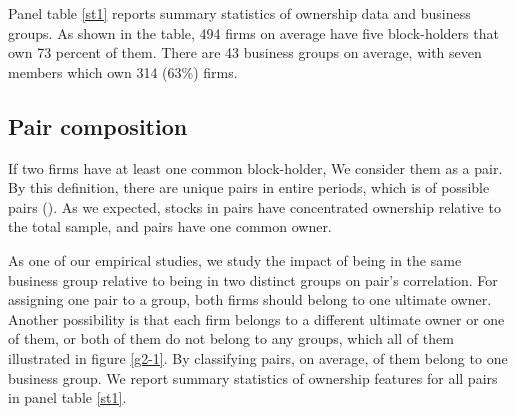 Panel  table \ref{st1} reports summary statistics of ownership data and business groups. As shown in the table, 494 firms on average have five block-holders that own 73 percent of them. There are 43 business groups on average, with seven members which own 314 (63\%) firms. 






\subsection{{Pair composition} }

	If two firms have at least one common block-holder, We consider them as a pair. By this definition, there are   unique pairs in entire periods, which is of possible pairs (). As we expected, stocks in pairs have concentrated ownership relative to the total sample, and pairs have one common owner.
	
	\normalcolor
	
	As one of our empirical studies, we study the impact of being in the same business group relative to being in two distinct groups on pair's correlation. 
	For assigning one pair to a group, both firms should belong to one ultimate owner. Another possibility is that each firm belongs to a different ultimate owner or one of them, or both of them do not belong to any groups, which all of them illustrated in figure \ref{g2-1}.
	By classifying pairs, on average, of them  belong to one business group. We report summary statistics of ownership features for all pairs in panel  table \ref{st1}.
	
